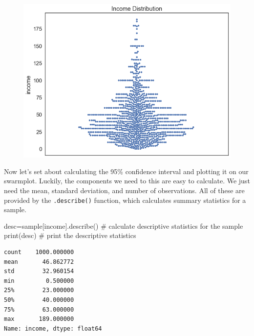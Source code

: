 \documentclass[
  letterpaper,
  DIV=11,
  numbers=noendperiod]{scrreprt}
\newenvironment{Shaded}{\begin{snugshade}}{\end{snugshade}}
\newcommand{\BuiltInTok}[1]{\textcolor[rgb]{0.00,0.23,0.31}{#1}}
\newcommand{\CommentTok}[1]{\textcolor[rgb]{0.37,0.37,0.37}{#1}}
\newcommand{\NormalTok}[1]{\textcolor[rgb]{0.00,0.23,0.31}{#1}}
\newcommand{\OperatorTok}[1]{\textcolor[rgb]{0.37,0.37,0.37}{#1}}
\newcommand{\StringTok}[1]{\textcolor[rgb]{0.13,0.47,0.30}{#1}}
\begin{document}
\begin{figure}[H]

{\centering \includegraphics{notebooks/W07. Distributions and Basic Statistics_files/figure-pdf/cell-31-output-2.png}

}

\end{figure}

Now let's set about calculating the 95\% confidence interval and
plotting it on our swarmplot. Luckily, the components we need to this
are easy to calculate. We just need the mean, standard deviation, and
number of observations. All of these are provided by the
\texttt{.describe()} function, which calculates summary statistics for a
sample.

\begin{Shaded}
\begin{Highlighting}[]
\NormalTok{desc}\OperatorTok{=}\NormalTok{sample[}\StringTok{\textquotesingle{}income\textquotesingle{}}\NormalTok{].describe() }\CommentTok{\# calculate descriptive statistics for the sample}
\BuiltInTok{print}\NormalTok{(desc) }\CommentTok{\# print the descriptive statistics}
\end{Highlighting}
\end{Shaded}

\begin{verbatim}
count    1000.000000
mean       46.862772
std        32.960154
min         0.500000
25%        23.000000
50%        40.000000
75%        63.000000
max       189.000000
Name: income, dtype: float64
\end{verbatim}
\end{document}
